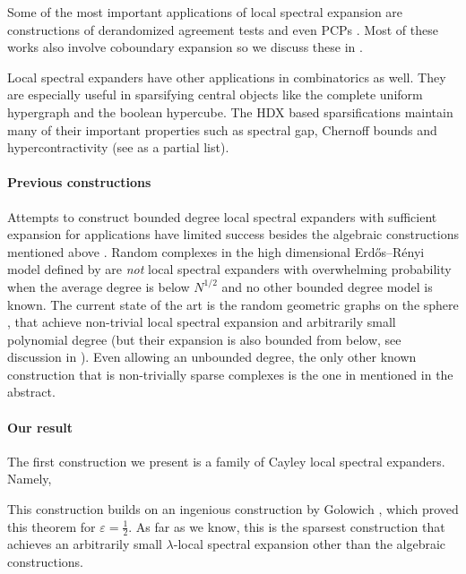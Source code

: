 Some of the most important applications of local spectral expansion are constructions of derandomized agreement tests \cite{DinurK2017,DiksteinD2019,GotlibK2022,BafnaM2024,DiksteinDL2024} and even PCPs \cite{bafna2024quasi}. Most of these works also involve coboundary expansion so we discuss these in . 

Local spectral expanders have other applications in combinatorics as well. They are especially useful in sparsifying central objects like the complete uniform hypergraph and the boolean hypercube. The HDX based sparsifications maintain many of their important properties such as spectral gap, Chernoff bounds and hypercontractivity (see \cite{KaufmanM2017,DiksteinDFH2018,kaufman2020high,GurLL2022,BafnaHKL2022,dikstein2024chernoff} as a partial list).

\paragraph{Previous constructions}Attempts to construct bounded degree local spectral expanders with sufficient expansion for applications have limited success besides the algebraic constructions mentioned above \cite{Ballantine2000,CartwrightSZ2003,Li2004,LubotzkySV2005,KaufmanO2021,ODonnellP2022,Dikstein2023}. Random complexes in the high dimensional Erdős–Rényi model defined by \cite{LinialM2006} are \emph{not} local spectral expanders with overwhelming probability when the average degree is below \(N^{1/2}\) and no other bounded degree model is known. The current state of the art is the random geometric graphs on the sphere \cite{LiuMSY2023}, that achieve non-trivial local spectral expansion and arbitrarily small polynomial degree (but their expansion is also bounded from below, see discussion in ). Even allowing an unbounded degree, the only other known construction that is non-trivially sparse complexes is the one in \cite{Golowich2023} mentioned in the abstract.

\paragraph{Our result}
The first construction we present is a family of Cayley local spectral expanders. Namely,
\begin{theorem} 
\end{theorem}
This construction builds on an ingenious construction by Golowich \cite{Golowich2023}, which proved this theorem for \(\varepsilon = \frac{1}{2}\). As far as we know, this is the sparsest construction that achieves an arbitrarily small \(\lambda\)-local spectral expansion other than the algebraic constructions.

